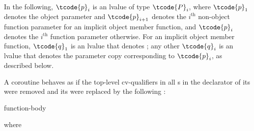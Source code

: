 \pnum
In the following, $\tcode{p}_i$ is an lvalue of type $\tcode{P}_i$,
where
$\tcode{p}_1$ denotes the object parameter and
$\tcode{p}_{i+1}$ denotes the $i^\text{th}$ non-object function parameter
for an implicit object member function, and
$\tcode{p}_i$ denotes
the $i^\text{th}$ function parameter otherwise.
For an implicit object member function,
$\tcode{q}_1$ is an lvalue that denotes ;
any other $\tcode{q}_i$ is an lvalue
that denotes the parameter copy corresponding to $\tcode{p}_i$,
as described below.

\pnum
A coroutine behaves as if
the top-level cv-qualifiers in all
s in the declarator
of its 
were removed and
its  were replaced by
the following :
\begin{ncsimplebnf}
\terminal{\{}\br
\bnfindent {}   \terminal{;}\br
\bnfindent {} \terminal{\{}\br
\bnfindent\bnfindent {}  \terminal{;}\br
\bnfindent\bnfindent function-body\br
\bnfindent {}\br
\bnfindent\bnfindent {}\br
\bnfindent\bnfindent\bnfindent {} \terminal{;}\br
\bnfindent\bnfindent {} \terminal{;}\br
\bnfindent \terminal{\}}\br
{} \terminal{:}\br
\bnfindent {}  \terminal{;}\br
\terminal{\}}
\end{ncsimplebnf}
where
